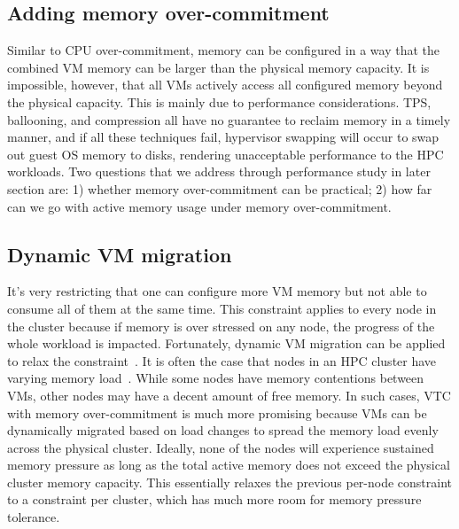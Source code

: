 \subsection{Adding memory over-commitment}
Similar to CPU over-commitment, memory can be configured in a way that the combined VM memory can be 
larger than the physical memory capacity. It is impossible, however, that all VMs actively access all configured 
memory beyond the physical capacity. This is mainly due to performance considerations. TPS, ballooning, and 
compression all have no guarantee to reclaim memory in a timely manner, and if all these techniques fail, 
hypervisor swapping will occur to swap out guest OS memory to disks, rendering unacceptable performance to 
the HPC workloads. Two questions that we address through performance study in later section are: 1) whether memory over-commitment 
can be practical; 2) how far can we go with active memory usage under memory over-commitment.

\subsection{Dynamic VM migration}
It's very restricting that one can configure more VM memory but not able to consume all of them 
at the same time. This constraint applies to every node in the cluster because if memory is over stressed on any 
node, the progress of the whole workload is impacted. 
Fortunately, dynamic VM migration can be applied to relax the constraint~\cite{KannigaDevi2018,infrastructure2006resource}. 
It is often the case that nodes in an HPC cluster have varying memory load~\cite{gupta2013improving}. While some nodes have memory contentions 
between VMs, other nodes may have a decent amount of free memory. In such cases, VTC with memory over-commitment 
is much more promising because VMs can be dynamically migrated based on load changes to  
spread the memory load evenly across the physical cluster. Ideally, none of the nodes will experience sustained memory pressure as long as 
the total active memory does not exceed the physical cluster memory capacity. This essentially relaxes the previous 
per-node constraint to a constraint per cluster, which has much more room for memory pressure tolerance. 